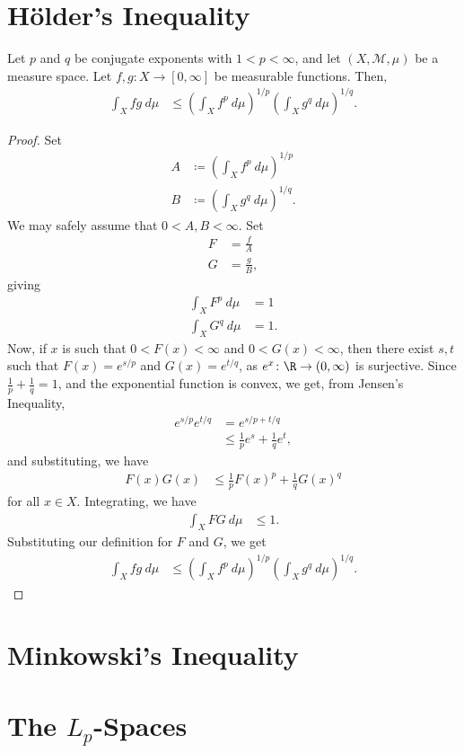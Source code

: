 \documentclass[10pt]{mypackage}
\begin{document}
\section{Hölder's Inequality}%
\begin{theorem}
  Let $p$ and $q$ be conjugate exponents with $1 < p < \infty$, and let $\left( X,\mathcal{M},\mu \right)$ be a measure space. Let $f,g\colon X\rightarrow [0,\infty]$ be measurable functions. Then,
  \begin{align*}
    \int_{X}^{} fg\:d\mu &\leq \left( \int_{ X }^{} f^{p}\:d\mu \right)^{1/p}\left( \int_{X}^{} g^{q}\:d\mu \right)^{1/q}.
  \end{align*}
\end{theorem}
\begin{proof}
  Set
  \begin{align*}
    A &\coloneq \left( \int_{X}^{} f^{p}\:d\mu \right)^{1/p}\\
    B &\coloneq \left( \int_{X}^{} g^{q}\:d\mu \right)^{1/q}.
  \end{align*}
  We may safely assume that $0 < A,B < \infty$. Set
  \begin{align*}
    F &= \frac{f}{A}\\
    G &= \frac{g}{B},
  \end{align*}
  giving
  \begin{align*}
    \int_{X}^{} F^{p}\:d\mu &= 1\\
    \int_{X}^{} G^{q}\:d\mu &= 1.
  \end{align*}
  Now, if $x$ is such that $0 < F(x) < \infty$ and $0 < G(x) < \infty$, then there exist $s,t$ such that $F(x) = e^{s/p}$ and $G(x) = e^{t/q}$, as $e^{x}\colon \R\rightarrow (0,\infty)$ is surjective. Since $\frac{1}{p} + \frac{1}{q} = 1$, and the exponential function is convex, we get, from Jensen's Inequality,
  \begin{align*}
    e^{s/p}e^{t/q} &= e^{s/p + t/q}\\
                   &\leq \frac{1}{p}e^{s} + \frac{1}{q}e^{t},
  \end{align*}
  and substituting, we have
  \begin{align*}
    F(x)G(x) &\leq \frac{1}{p}F(x)^{p} + \frac{1}{q}G(x)^{q}
  \end{align*}
  for all $x\in X$. Integrating, we have
  \begin{align*}
    \int_{X}^{} FG\:d\mu &\leq 1.
  \end{align*}
  Substituting our definition for $F$ and $G$, we get
  \begin{align*}
    \int_{X}^{} fg\:d\mu &\leq \left( \int_{X}^{} f^p\:d\mu \right)^{1/p} \left( \int_{X}^{} g^{q}\:d\mu \right)^{1/q}.
  \end{align*}
\end{proof}
\section{Minkowski's Inequality}%
\section{The $L_p$-Spaces}%
\end{document}
